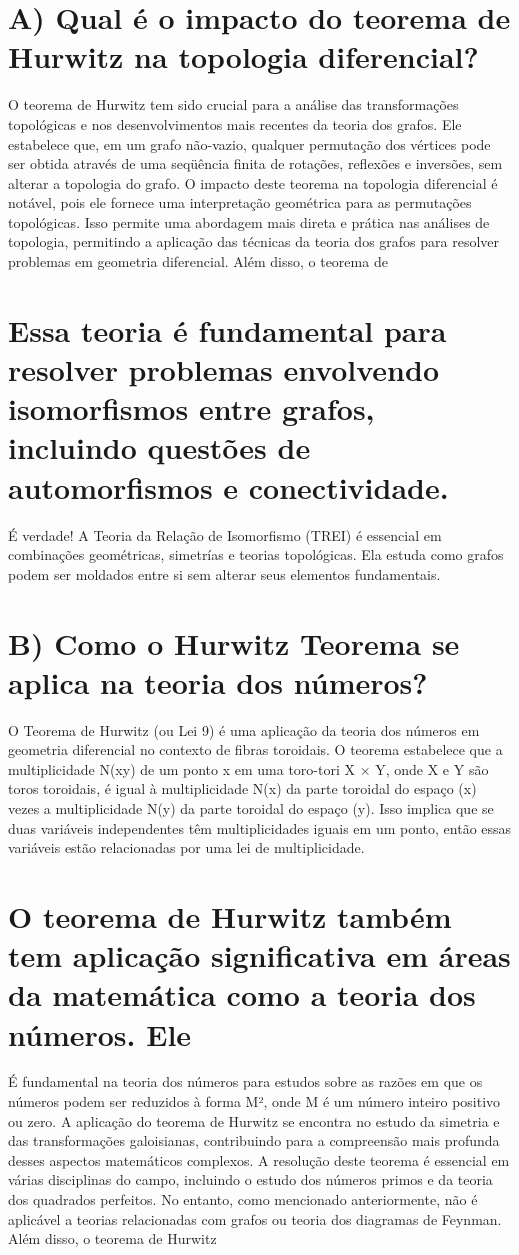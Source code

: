\documentclass[11pt,a4paper]{article}
\begin{document}
\section{A) Qual é o impacto do teorema de Hurwitz na topologia diferencial?}
O teorema de Hurwitz tem sido crucial para a análise das transformações topológicas e nos desenvolvimentos mais recentes da teoria dos grafos. Ele estabelece que, em um grafo não-vazio, qualquer permutação dos vértices pode ser obtida através de uma seqüência finita de rotações, reflexões e inversões, sem alterar a topologia do grafo. O impacto deste teorema na topologia diferencial é notável, pois ele fornece uma interpretação geométrica para as permutações topológicas. Isso permite uma abordagem mais direta e prática nas análises de topologia, permitindo a aplicação das técnicas da teoria dos grafos para resolver problemas em geometria diferencial. Além disso, o teorema de

\section{Essa teoria é fundamental para resolver problemas envolvendo isomorfismos entre grafos, incluindo questões de automorfismos e conectividade.}
É verdade! A Teoria da Relação de Isomorfismo (TREI) é essencial em combinações geométricas, simetrías e teorias topológicas. Ela estuda como grafos podem ser moldados entre si sem alterar seus elementos fundamentais.

\section{B) Como o Hurwitz Teorema se aplica na teoria dos números?}
O Teorema de Hurwitz (ou Lei 9) é uma aplicação da teoria dos números em geometria diferencial no contexto de fibras toroidais. O teorema estabelece que a multiplicidade N(xy) de um ponto x em uma toro-tori X × Y, onde X e Y são toros toroidais, é igual à multiplicidade N(x) da parte toroidal do espaço (x) vezes a multiplicidade N(y) da parte toroidal do espaço (y). Isso implica que se duas variáveis independentes têm multiplicidades iguais em um ponto, então essas variáveis estão relacionadas por uma lei de multiplicidade.

\section{O teorema de Hurwitz também tem aplicação significativa em áreas da matemática como a teoria dos números. Ele}
É fundamental na teoria dos números para estudos sobre as razões em que os números podem ser reduzidos à forma M², onde M é um número inteiro positivo ou zero. A aplicação do teorema de Hurwitz se encontra no estudo da simetria e das transformações galoisianas, contribuindo para a compreensão mais profunda desses aspectos matemáticos complexos. A resolução deste teorema é essencial em várias disciplinas do campo, incluindo o estudo dos números primos e da teoria dos quadrados perfeitos. No entanto, como mencionado anteriormente, não é aplicável a teorias relacionadas com grafos ou teoria dos diagramas de Feynman. Além disso, o teorema de Hurwitz
\end{document}
